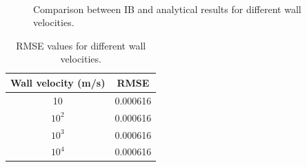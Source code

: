 \begin{figure}[H]
    \centering
    \quad
    \\
    \quad
    \caption{Comparison between IB and analytical results for different wall velocities.}
    \label{fig:C3_virtualBoundaryResultWallVelocity}
\end{figure}

\begin{table}[H]
\centering
\begin{tabular}{c | c}
     Wall velocity (m/s) & RMSE \\ \hline \hline
     10 & 0.000616\\ \hline
     $10^2$ & 0.000616 \\ \hline
     $10^3$ & 0.000616 \\ \hline
     $10^4$ & 0.000616 \\
\end{tabular}
\caption{RMSE values for different wall velocities.}
\label{table:C3_virtualBoundaryResultWallVelocityRMSE}
\end{table}

